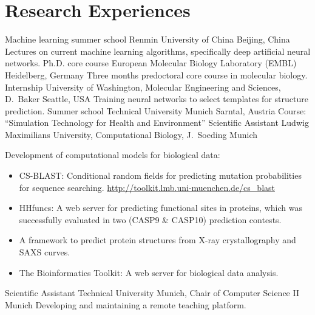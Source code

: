 \documentclass[11pt,a4paper]{moderncv}
\begin{document}
\section {Research Experiences}
         {Machine learning summer school}
         {Renmin University of China}
         {Beijing, China}
         {}
         {Lectures on current machine learning algorithms, specifically deep
           artificial neural networks.}
         {Ph.D. core course}
         {European Molecular Biology Laboratory (EMBL)}
         {Heidelberg, Germany}
         {}
         {Three months predoctoral core course in molecular biology.}
         {Internship}
         {University of Washington, Molecular Engineering and Sciences, D.~Baker}
         {Seattle, USA}
         {}
         {Training neural networks to select templates for structure prediction.}
         {Summer school}
         {Technical University Munich}
         {Sarntal, Austria}
         {}
         {Course: ``Simulation Technology for Health and Environment''}
         {Scientific Assistant}
         {Ludwig Maximilians University, Computational Biology, J.~Soeding}
         {Munich}
         {}
         {Development of computational models for biological data: {}%
            \begin{itemize}%
              \item CS-BLAST: Conditional random fields for predicting mutation
                probabilities for sequence searching. \hfill\break
                {\small\url{http://toolkit.lmb.uni-muenchen.de/cs\_blast}}
              \item HHfuncs: A web server for predicting functional sites in
                proteins, which was successfully evaluated in two (CASP9 \&
                CASP10) prediction contests.
              \item A framework to predict protein structures from X-ray
                crystallography and SAXS curves.
              \item The Bioinformatics Toolkit: A web server for biological data
                analysis.\hfill{}
            \end{itemize}
         }
         {Scientific Assistant}
         {Technical University Munich, Chair of Computer Science II}
         {Munich}
         {}
         {Developing and maintaining a remote teaching platform.
           \hfill{}}
\end{document}

